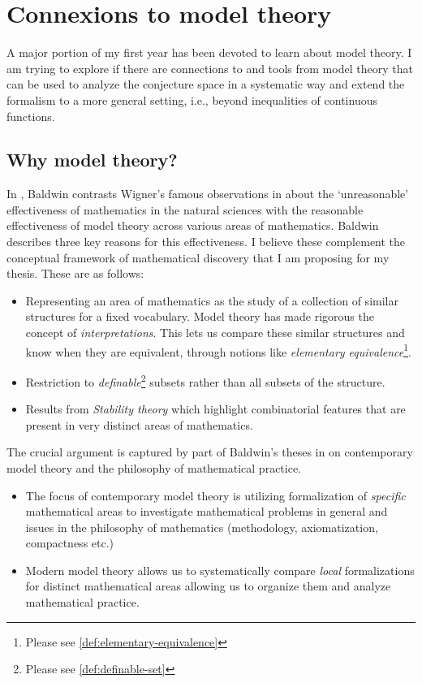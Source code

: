 \section{Connexions to model theory}
A major portion of my first year has been devoted to learn about model theory. I am trying to explore if there are connections to and tools from model theory that can be used to analyze the conjecture space in a systematic way and extend the formalism to a more general setting, i.e., beyond inequalities of continuous functions.
\subsection{Why model theory?}
In \cite{baldwin2020reasonable}, Baldwin contrasts Wigner's famous observations in \cite{wigner1990unreasonable} about the `unreasonable' effectiveness of mathematics in the natural sciences with the reasonable effectiveness of model theory across various areas of mathematics. Baldwin describes three key reasons for this effectiveness.
I believe these complement the conceptual framework of mathematical discovery that I am proposing for my thesis. These are as follows:
\begin{itemize}
    \item Representing an area of mathematics as the study of a collection of similar structures for a fixed vocabulary. Model theory has made rigorous the concept of \textit{interpretations}. This lets us compare these similar structures and know when they are equivalent, through notions like \textit{elementary equivalence}\footnote[1]{Please see \ref{def:elementary-equivalence}}.
    \item Restriction to \textit{definable}\footnote[2]{Please see \ref{def:definable-set}} subsets rather than all subsets of the structure.
    \item Results from \textit{Stability theory} which highlight combinatorial features that are present in very distinct areas of mathematics. 
\end{itemize} 

The crucial argument is captured by part of Baldwin's theses in \cite{Baldwin_2018} on contemporary model theory and the philosophy of mathematical practice.
\begin{itemize}
    \item The focus of contemporary model theory is utilizing formalization of \textit{specific} mathematical areas to investigate mathematical problems in general and issues in the philosophy of mathematics (methodology, axiomatization, compactness etc.)
    \item Modern model theory allows us to systematically compare \textit{local} formalizations for distinct mathematical areas allowing us to organize them and analyze mathematical practice.
\end{itemize}

